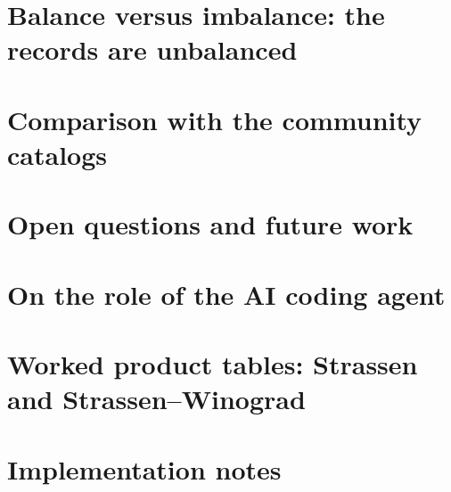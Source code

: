 \documentclass[11pt,a4paper]{article}
\begin{document}
\section{Balance versus imbalance: the records are unbalanced}\label{sec:balance}


\section{Comparison with the community catalogs}\label{sec:tables}


\section{Open questions and future work}\label{sec:openquestions}


\section{On the role of the AI coding agent}\label{sec:aiagent}


\appendix

\section{Worked product tables: Strassen and Strassen--Winograd}


\section{Implementation notes}




\end{document}
